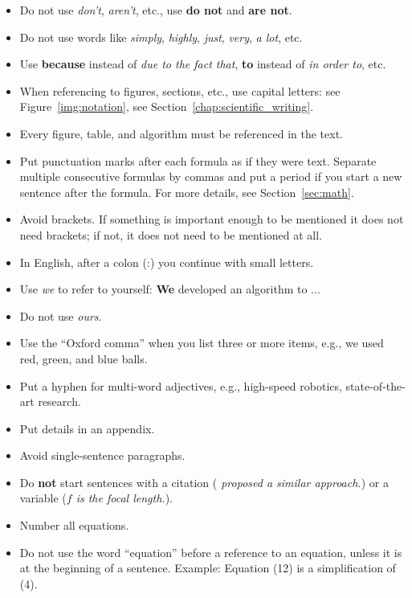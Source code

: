 \begin{itemize}
	\item Do not use \emph{don't}, \emph{aren't}, etc., use \textbf{do not} and \textbf{are not}.
	\item Do not use words like \emph{simply}, \emph{highly}, \emph{just}, \emph{very}, \emph{a lot}, etc.
	\item Use \textbf{because} instead of \emph{due to the fact that}, \textbf{to} instead of \emph{in order to}, etc.
	\item When referencing to figures, sections, etc., use capital letters: see Figure~\ref{img:notation}, see Section~\ref{chap:scientific_writing}.
	\item Every figure, table, and algorithm must be referenced in the text.
	\item Put punctuation marks after each formula as if they were text. 
	Separate multiple consecutive formulas by commas and put a period if you start a new sentence after the formula.
	For more details, see Section~\ref{sec:math}.
	\item Avoid brackets. If something is important enough to be mentioned it does not need brackets; if not, it does not need to be mentioned at all.
	\item In English, after a colon (:) you continue with small letters.
	\item Use \emph{we} to refer to yourself: \textbf{We} developed an algorithm to ...
	\item Do not use \emph{ours}.
	\item Use the ``Oxford comma'' when you list three or more items, e.g., we used red, green, and blue balls.
	\item Put a hyphen for multi-word adjectives, e.g., high-speed robotics, state-of-the-art research.
	\item Put details in an appendix.
	\item Avoid single-sentence paragraphs.
	\item Do \textbf{not} start sentences with a citation (\emph{\cite{KleinMurray2007} proposed a similar approach.}) or a variable (\emph{$f$ is the focal length.}).
	\item Number all equations.
	\item Do not use the word ``equation'' before a reference to an equation, unless it is at the beginning of a sentence.
	Example: Equation (12) is a simplification of (4).
\end{itemize}